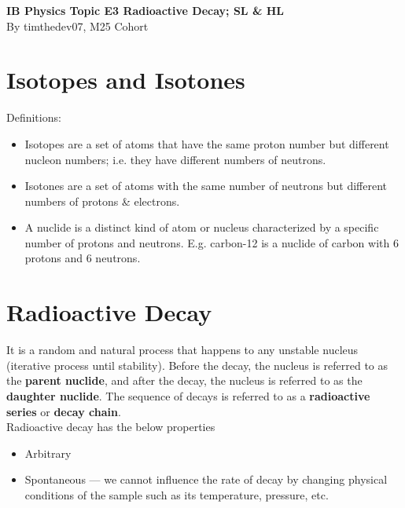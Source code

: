\documentclass[a4paper,12pt]{article}
\let\oldsection\section
\renewcommand\section{\clearpage\oldsection}
\newcommand{\lb}{\\[8pt]}
\begin{document}
\pagestyle{fancy}


\begin{titlepage}
  \begin{center}

    \vspace*{8cm}
    \textbf{\Large {IB Physics Topic E3 Radioactive Decay; SL \& HL}} \\
    \vspace*{1cm}
    \large{By timthedev07, M25 Cohort}

  \end{center}
\end{titlepage}

\pagebreak
\tableofcontents
\pagebreak

\clearpage
\setcounter{page}{1}

\section{Isotopes and Isotones}

Definitions:

\begin{itemize}
  \item Isotopes are a set of atoms that have the same proton number but different nucleon numbers; i.e. they have different numbers of neutrons.
  \item Isotones are a set of atoms with the same number of neutrons but different numbers of protons \& electrons.
  \item A nuclide is a distinct kind of atom or nucleus characterized by a specific number of protons and neutrons. E.g. carbon-12 is a nuclide of carbon with 6 protons and 6 neutrons.
\end{itemize}

\section{Radioactive Decay}

It is a random and natural process that happens to any unstable nucleus (iterative process until stability). Before the decay, the nucleus is referred to as the \textbf{parent nuclide}, and after the decay, the nucleus is referred to as the \textbf{daughter nuclide}. The sequence of decays is referred to as a \textbf{radioactive series} or \textbf{decay chain}.\lb
Radioactive decay has the below properties
\begin{itemize}
  \item Arbitrary
  \item Spontaneous --- we cannot influence the rate of decay by changing physical conditions of the sample such as its temperature, pressure, etc.
\end{itemize}
\end{document}
